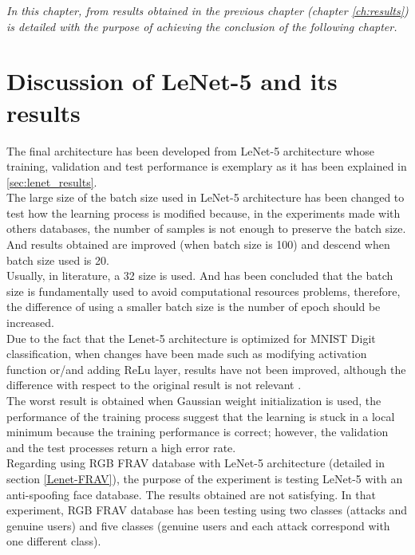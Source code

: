 \begin{small}
\emph{In this chapter, from results obtained in the previous chapter (chapter \ref{ch:results}) is detailed with the purpose of achieving the conclusion of the following chapter.\\}
\end{small}

\section{Discussion of LeNet-5 and its results}
The final architecture has been developed from LeNet-5 architecture whose training, validation and test performance is exemplary as it has been explained in \ref{sec:lenet_results}.\\

The large size of the batch size used in LeNet-5 architecture has been changed to test how the learning process is modified because, in the experiments made with others databases, the number of samples is not enough to preserve the batch size.  And results obtained are improved (when batch size is 100) and descend when batch size used is 20. \\

Usually, in literature, a 32 size is used. And has been concluded that the batch size is 
 fundamentally used to avoid computational resources problems, therefore, the difference of using a smaller batch size is the number of epoch should be increased.\\

Due to the fact that the Lenet-5 architecture is optimized for MNIST Digit classification, when changes have been made such as modifying activation function or/and adding ReLu layer, results have not been improved, although the difference with respect to the original result is not relevant .\\

The worst result is obtained when Gaussian weight initialization is used, the performance of the training process suggest that the learning is stuck in a local minimum because the training performance is correct; however, the validation and the test processes return a high error rate.\\

Regarding using RGB FRAV database with LeNet-5 architecture (detailed in section \ref{Lenet-FRAV}), the purpose of the experiment is testing LeNet-5 with an anti-spoofing face database. The results obtained are not satisfying. In that experiment, RGB FRAV database has been testing using two classes (attacks and genuine users) and five classes (genuine users and each attack correspond with one different class).\\


